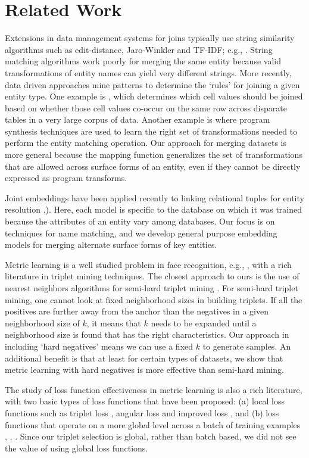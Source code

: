 \section{Related Work}
Extensions in data management systems for joins typically use string similarity algorithms such as edit-distance, Jaro-Winkler and TF-IDF; e.g., \cite{Cohen2003}.  String matching algorithms work poorly for merging the same entity because valid transformations of entity names can yield very different strings.  More recently, data driven approaches mine patterns to determine the `rules' for joining a given entity type.  One example is \cite{He:2015:SJS:2824032.2824036}, which determines which cell values should be joined based on whether those cell values co-occur on the same row across disparate tables in a very large corpus of data.  Another example is\cite{auto-join-joining-tables-leveraging-transformations} where program synthesis techniques are used to learn the right set of transformations needed to perform the entity matching operation.  Our approach for merging datasets is more general because the mapping function generalizes the set of transformations that are allowed across surface forms of an entity, even if they cannot be directly expressed as program transforms.

Joint embeddings have been applied recently to linking relational tuples for entity resolution \cite{Mudgal},\cite{Bordawekar18}).  Here, each model is specific to the database on which it was trained because the attributes of an entity vary among databases.  Our focus is on techniques for name matching, and we develop general purpose embedding models for merging alternate surface forms of key entities.  

Metric learning is a well studied problem in face recognition, e.g., \cite{DBLP:conf/cvpr/SchroffKP15}, with a rich literature in triplet mining techniques.  The closest approach to ours is the use of nearest neighbors algorithms for semi-hard triplet mining \cite{DBLP:journals/corr/KumarHC0D17}.  For semi-hard triplet mining, one cannot look at fixed neighborhood sizes in building triplets.  If all the positives are further away from the anchor than the negatives in a given neighborhood size of $k$, it means that $k$ needs to be expanded until a neighborhood size is found that has the right characteristics.  Our approach in including `hard negatives' means we can use a fixed $k$ to generate samples.  An additional benefit is that at least for certain types of datasets, we show that metric learning with hard negatives is more effective than semi-hard mining.

The study of loss function effectiveness in metric learning is also a rich literature, with two basic types of loss functions that have been proposed: (a) local loss functions such as triplet loss \cite{DBLP:conf/cvpr/SchroffKP15}, angular loss \cite{Zhang:2016:DML:3088616.3088665} and improved loss \cite{DBLP:journals/corr/abs-1708-01682}, and (b) loss functions that operate on a more global level across a batch of training examples \cite{NIPS2016_6200}, \cite{DBLP:conf/cvpr/SongXJS16}, \cite{songCVPR17}.   Since our triplet selection is global, rather than batch based, we did not see the value of using global loss functions.
